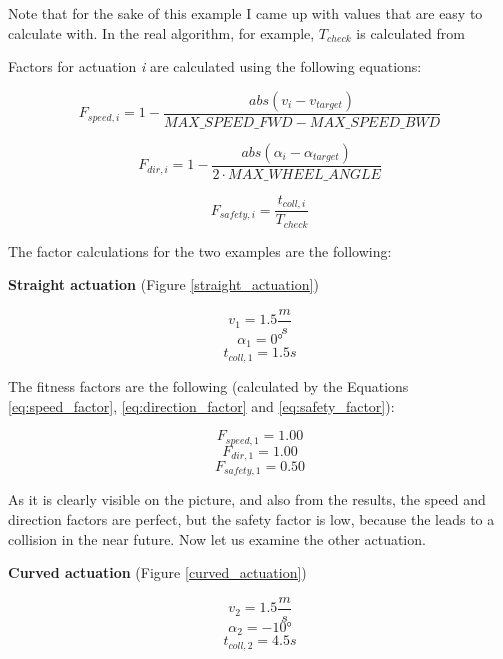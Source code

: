 \begin{minipage}{\textwidth}
Note that for the sake of this example I came up with values that are easy to calculate with. In the real algorithm, for example, $T_{check}$ is calculated from 

Factors for actuation \textit{i} are calculated using the following equations:

\begin{equation}\label{eq:speed_factor}
F_{speed,i} = 1 - \frac{abs(v_{i} - v_{target})}{MAX\_SPEED\_FWD - MAX\_SPEED\_BWD}
\end{equation}

\begin{equation}\label{eq:direction_factor}
F_{dir,i} = 1 - \frac{abs(\alpha_{i} - \alpha_{target})}{2 \cdot MAX\_WHEEL\_ANGLE}
\end{equation}

\begin{equation}\label{eq:safety_factor}
F_{safety,i} = \frac{t_{coll,i}}{T_{check}}
\end{equation}

\end{minipage}

\begin{minipage}{\textwidth}

The factor calculations for the two examples are the following:

\textbf{Straight actuation} (Figure \ref{straight_actuation})

\[ v_{1} = 1.5 \frac{m}{s} \]
\[ \alpha_{1} = 0° \]
\[ t_{coll,1} = 1.5 s \]
\end{minipage}

\begin{minipage}{\textwidth}
The fitness factors are the following (calculated by the Equations \ref{eq:speed_factor}, \ref{eq:direction_factor} and \ref{eq:safety_factor}):

\[ F_{speed,1} = 1.00 \]
\[ F_{dir,1} = 1.00 \]
\[ F_{safety,1} = 0.50 \]
\end{minipage}

As it is clearly visible on the picture, and also from the results, the speed and direction factors are perfect, but the safety factor is low, because the leads to a collision in the near future. Now let us examine the other actuation.

\begin{minipage}{\textwidth}
\textbf{Curved actuation} (Figure \ref{curved_actuation})

\[ v_{2} = 1.5 \frac{m}{s} \]
\[ \alpha_{2} = -10° \]
\[ t_{coll,2} = 4.5 s \]
\end{minipage}

